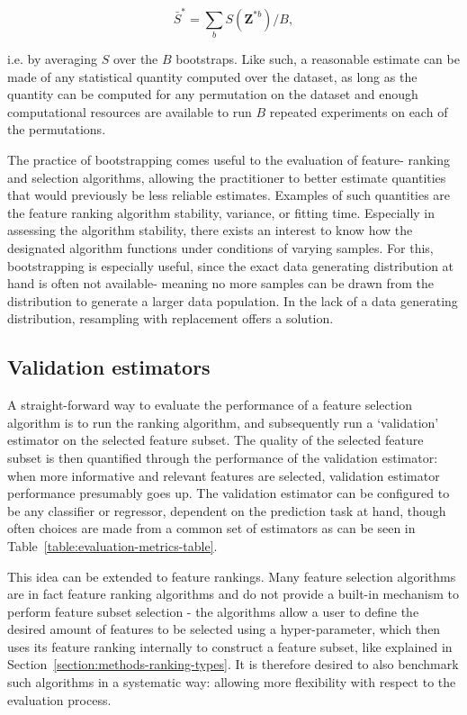\documentclass[../main.tex]{subfiles}
\begin{document}
\begin{equation}\label{eq:average-bootstrap}
\bar{S}^{*}=\sum_{b} S\left(\mathbf{Z}^{* b}\right) / B,
\end{equation}

i.e. by averaging $S$ over the $B$ bootstraps. Like such, a reasonable estimate can be made of any statistical quantity computed over the dataset, as long as the quantity can be computed for any permutation on the dataset and enough computational resources are available to run $B$ repeated experiments on each of the permutations.

The practice of bootstrapping comes useful to the evaluation of feature- ranking and selection algorithms, allowing the practitioner to better estimate quantities that would previously be less reliable estimates. Examples of such quantities are the feature ranking algorithm stability, variance, or fitting time. Especially in assessing the algorithm stability, there exists an interest to know how the designated algorithm functions under conditions of varying samples. For this, bootstrapping is especially useful, since the exact data generating distribution at hand is often not available- meaning no more samples can be drawn from the distribution to generate a larger data population. In the lack of a data generating distribution, resampling with replacement offers a solution.




\subsection{Validation estimators}\label{section:evaluation-validation-estimators}
A straight-forward way to evaluate the performance of a feature selection algorithm is to run the ranking algorithm, and subsequently run a `validation' estimator on the selected feature subset. The quality of the selected feature subset is then quantified through the performance of the validation estimator: when more informative and relevant features are selected, validation estimator performance presumably goes up. The validation estimator can be configured to be any classifier or regressor, dependent on the prediction task at hand, though often choices are made from a common set of estimators as can be seen in Table~\ref{table:evaluation-metrics-table}. 

This idea can be extended to feature rankings. Many feature selection algorithms are in fact feature ranking algorithms and do not provide a built-in mechanism to perform feature subset selection - the algorithms allow a user to define the desired amount of features to be selected using a hyper-parameter, which then uses its feature ranking internally to construct a feature subset, like explained in Section~\ref{section:methods-ranking-types}. It is therefore desired to also benchmark such algorithms in a systematic way: allowing more flexibility with respect to the evaluation process.
\end{document}
